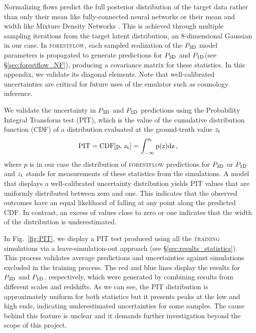 \documentclass[fleqn,usenatbib]{mnras}
\newcommand{\poned}{\ensuremath{P_{\rm 1D}}\xspace}
\newcommand{\pthreed}{\ensuremath{P_{\rm 3D}}\xspace}
\newcommand{\forestflow}{\textsc{forestflow}\xspace}
\newcommand{\lacehc}{\textsc{training}\xspace}
\begin{document}
Normalizing flows predict the full posterior distribution of the target data rather than only their mean like fully-connected neural networks or their mean and width like Mixture Density Networks \citep[see][for some applications in cosmology]{ramachandra2022MachineLearningSynthetic, cabayol-garcia2023NeuralNetworkEmulator}. This is achieved through multiple sampling iterations from the target latent distribution, an 8-dimensional Gaussian in our case. In \forestflow, each sampled realization of the \pthreed model parameters is propagated to generate predictions for \pthreed and \poned (see \S\ref{sec:forestflow_NF}), producing a covariance matrix for these statistics. In this appendix, we validate its diagonal elements. Note that well-calibrated uncertainties are critical for future uses of the emulator such as cosmology inference.

We validate the uncertainty in \pthreed and \poned predictions using the Probability Integral Transform test (PIT), which is the value of the cumulative distribution function (CDF) of a distribution evaluated at the ground-truth value $z_{\rm t}$
%
\begin{equation}
    \rm{PIT} = \mathrm{CDF}[p,\,z_{\rm t}]=\int_{-\infty}^{z_{\rm t}} p(z) \mathrm{d}z\, ,
    \label{eq:pit} 
\end{equation} 
%
where $p$ is in our case the distribution of \forestflow predictions for \pthreed or \poned and $z_{\rm t}$ stands for measurements of these statistics from the simulations. A model that displays a well-calibrated uncertainty distribution yields PIT values that are uniformly distributed between zero and one. This indicates that the observed outcomes have an equal likelihood of falling at any point along the predicted CDF. In contrast, an excess of values close to zero or one indicates that the width of the distribution is underestimated.

In Fig.~\ref{fig:PIT}, we display a PIT test produced using all the \lacehc simulations via a leave-simulation-out approach (see \S\ref{sec:results_statistics}). This process validates average predictions and uncertainties against simulations excluded in the training process. The red and blue lines display the results for \pthreed and \poned, respectively, which were generated by combining results from different scales and redshifts. As we can see, the PIT distribution is approximately uniform for both statistics but it presents peaks at the low and high ends, indicating underestimated uncertainties for some samples. The cause behind this feature is unclear and it demands further investigation beyond the scope of this project.


\bsp	%
\label{lastpage}
\end{document}
